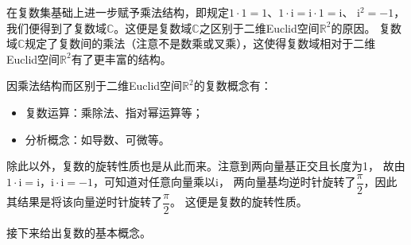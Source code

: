 \documentclass[UTF8,fontset=fandol,zihao=5]{ctexart}
\newcommand{\ii}{\mathrm{i}}
\newcommand{\CC}{\mathbb{C}}
\newcommand{\RR}{\mathbb{R}}
\begin{document}
在复数集基础上进一步赋予乘法结构，即规定$1\cdot1=1$、$1\cdot \ii=\ii\cdot1=\ii$、
$\ii^2=-1$，
我们便得到了复数域$\CC$。这便是复数域$\CC$之区别于二维Euclid空间$\RR^2$的原因。
复数域$\CC$规定了复数间的乘法（注意不是数乘或叉乘），这使得复数域相对于二维
Euclid空间$\RR^2$有了更丰富的结构。

因乘法结构而区别于二维Euclid空间$\RR^2$的复数概念有：
\begin{itemize}
  \item 复数运算：乘除法、指对幂运算等；
  \item 分析概念：如导数、可微等。
\end{itemize}

除此以外，复数的旋转性质也是从此而来。注意到两向量基正交且长度为1，
故由$1 \cdot \ii = \ii$，$\ii \cdot \ii = -1$，可知道对任意向量乘以$\ii$，
两向量基均逆时针旋转了$\dfrac{\pi}{2}$，因此其结果是将该向量逆时针旋转了$\dfrac{\pi}{2}$。
这便是复数的旋转性质。

接下来给出复数的基本概念。
\end{document}
